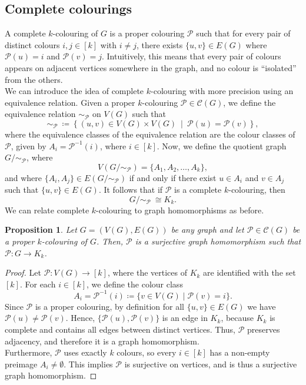 \documentclass[12pt]{amsart}
\numberwithin{figure}{section}
\theoremstyle{plain}
\newtheorem{proposition}[theorem]{Proposition}
\begin{document}
\subsection{Complete colourings} A complete $k$-colouring of $G$ is a proper colouring $\mathcal{P}$ such that for every pair of distinct colours $i, j\in[k]$ with $i\neq j$, there exists $\{u,v\}\in E(G)$ where $\mathcal{P}(u) = i$ and $\mathcal{P}(v) = j$. Intuitively, this means that every pair of colours appears on adjacent vertices somewhere in the graph, and no colour is “isolated” from the others.\\
\indent We can introduce the idea of complete $k$-colouring with more precision using an equivalence relation. Given a proper $k$-colouring $\mathcal{P}\in\mathscr{C}(G)$, we define the equivalence relation $\sim_{\mathcal{P}}$ on $V(G)$ such that
\[\sim_{\mathcal{P}}\:\coloneq\left\{(u,v)\in V(G)\times V(G)\:\middle|\:\mathcal{P}(u) = \mathcal{P}(v)\right\},\]
where the equivalence classes of the equivalence relation are the colour classes of $\mathcal{P}$, given by $A_{i} = \mathcal{P}^{-1}(i)$, where $i\in[k]$. Now, we define the quotient graph $G/\!\sim_{\mathcal{P}}$, where
\[V(G/\!\sim_{\mathcal{P}}) = \{A_{1},A_{2},\dots,A_{k}\},\]
and where $\{A_{i},A_{j}\}\in E(G/\!\sim_{\mathcal{P}})$ if and only if there exist $u \in A_{i}$ and $v\in A_{j}$ such that $\{u,v\}\in E(G)$. It follows that if $\mathcal{P}$ is a complete $k$-colouring, then
\[G/\!\sim_{\mathcal{P}}\:\cong K_{k}.\]
\indent We can relate complete $k$-colouring to graph homomorphisms as before.
\begin{proposition}
    Let $G = (V(G), E(G))$ be any graph and let $\mathcal{P}\in\mathscr{C}(G)$ be a proper $k$-colouring of $G$. Then, $\mathcal{P}$ is a surjective graph homomorphism such that $\mathcal{P}: G\to K_{k}$.
\end{proposition}
\begin{proof} 
    Let $\mathcal{P} : V(G) \to [k]$, where the vertices of $K_{k}$ are identified with the set $[k]$. For each $i \in [k]$, we define the colour class
    \[A_{i} = \mathcal{P}^{-1}(i) \coloneq \{ v \in V(G) \mid \mathcal{P}(v) = i \}.\]
    Since $\mathcal{P}$ is a proper colouring, by definition for all $\{u,v\} \in E(G)$ we have $\mathcal{P}(u) \neq \mathcal{P}(v)$. Hence, $\{\mathcal{P}(u), \mathcal{P}(v)\}$ is an edge in $K_{k}$, because $K_{k}$ is complete and contains all edges between distinct vertices. Thus, $\mathcal{P}$ preserves adjacency, and therefore it is a graph homomorphism.\\
    \indent Furthermore, $\mathcal{P}$ uses exactly $k$ colours, so every $i \in [k]$ has a non-empty preimage $A_{i}\neq\emptyset$. This implies $\mathcal{P}$ is surjective on vertices, and is thus a surjective graph homomorphism.
\end{proof}
\end{document}
